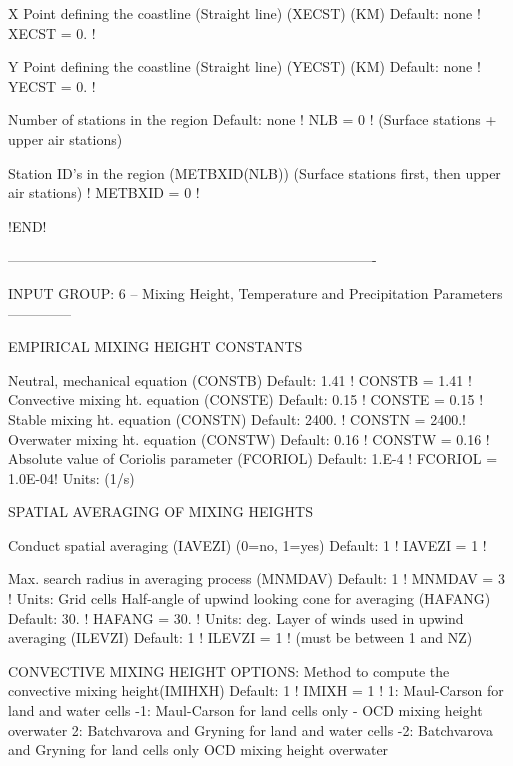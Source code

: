 \documentclass[a4paper,10pt]{article}
\begin{document}
         X Point defining the coastline (Straight line)
                   (XECST)  (KM)   Default: none    ! XECST = 0. !

         Y Point defining the coastline (Straight line)
                   (YECST)  (KM)   Default: none    ! YECST = 0. !


       Number of stations in the region     Default: none ! NLB =  0 ! 
       (Surface stations + upper air stations)

       Station ID's  in the region   (METBXID(NLB))
       (Surface stations first, then upper air stations)
         ! METBXID =  0 !

!END!


-------------------------------------------------------------------------------

INPUT GROUP: 6 -- Mixing Height, Temperature and Precipitation Parameters
--------------

    EMPIRICAL MIXING HEIGHT CONSTANTS

       Neutral, mechanical equation
       (CONSTB)                              Default: 1.41   ! CONSTB = 1.41 !
       Convective mixing ht. equation
       (CONSTE)                              Default: 0.15   ! CONSTE = 0.15 !
       Stable mixing ht. equation
       (CONSTN)                              Default: 2400.  ! CONSTN = 2400.!
       Overwater mixing ht. equation
       (CONSTW)                              Default: 0.16   ! CONSTW = 0.16 !
       Absolute value of Coriolis
       parameter (FCORIOL)                   Default: 1.E-4  ! FCORIOL = 1.0E-04!
                                             Units: (1/s)

    SPATIAL AVERAGING OF MIXING HEIGHTS

       Conduct spatial averaging
       (IAVEZI)  (0=no, 1=yes)               Default: 1      ! IAVEZI =  1  !

       Max. search radius in averaging
       process (MNMDAV)                      Default: 1      ! MNMDAV =  3  !
                                             Units: Grid
                                                    cells
       Half-angle of upwind looking cone
       for averaging (HAFANG)                Default: 30.    ! HAFANG = 30. !
                                             Units: deg.
       Layer of winds used in upwind
       averaging (ILEVZI)                    Default: 1      ! ILEVZI =  1  !
       (must be between 1 and NZ)


    CONVECTIVE MIXING HEIGHT OPTIONS:
       Method to compute the convective
       mixing height(IMIHXH)                 Default: 1      ! IMIXH =  1  !
           1: Maul-Carson for land and water cells
          -1: Maul-Carson for land cells only -
              OCD mixing height overwater
           2: Batchvarova and Gryning for land and water cells
          -2: Batchvarova and Gryning for land cells only
              OCD mixing height overwater
\end{document}
